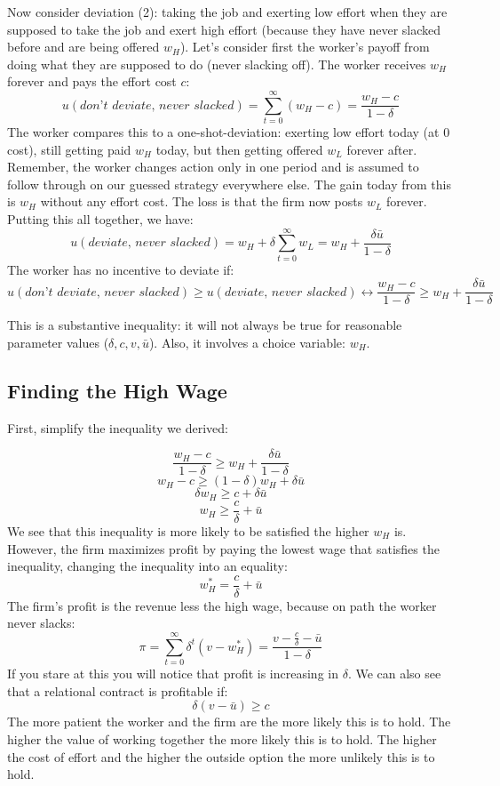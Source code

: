 \documentclass[14pt]{article}
\begin{document}
Now consider deviation (2): taking the job and exerting low effort when they are supposed to take the job and exert high effort (because they have never slacked before and are being offered $w_H$). Let's consider first the worker's payoff from doing what they are supposed to do (never slacking off). The worker receives $w_H$ forever and pays the effort cost $c$:
\[u(\textit{don't deviate, never slacked})=\sum_{t=0}^\infty (w_H-c)=\frac{w_H-c}{1-\delta}\]
The worker compares this to a one-shot-deviation: exerting low effort today (at 0 cost), still getting paid $w_H$ today, but then getting offered $w_L$ forever after. Remember, the worker changes action only in one period and is assumed to follow through on our guessed strategy everywhere else. The gain today from this is $w_H$ without any effort cost. The loss is that the firm now posts $w_L$ forever. Putting this all together, we have:
\[u(\textit{deviate, never slacked})=w_H+\delta \sum_{t=0}^\infty w_L = w_H+ \frac{\delta \bar u}{1-\delta}\]
The worker has no incentive to deviate if:
\[u(\textit{don't deviate, never slacked}) \geq u(\textit{deviate, never slacked}) \leftrightarrow \frac{w_H-c}{1-\delta}\geq w_H+ \frac{\delta \bar u}{1-\delta}\]

This is a substantive inequality: it will not always be true for reasonable parameter values ($\delta, c, v, \bar u$). Also, it involves a choice variable: $w_H$.

\subsection{Finding the High Wage}

First, simplify the inequality we derived:

\[\frac{w_H-c}{1-\delta}\geq w_H+ \frac{\delta \bar u}{1-\delta}\]
\[w_H-c \geq (1-\delta) w_H +\delta \bar u\]
\[\delta w_H \geq c +\delta \bar u\]
\[w_H \geq   \frac{c}{\delta}+\bar u\]
We see that this inequality is more likely to be satisfied the higher $w_H$ is. However, the firm maximizes profit by paying the lowest wage that satisfies the inequality, changing the inequality into an equality:
\[w_H^*=\frac{c}{\delta}+\bar u\]
The firm's profit is the revenue less the high wage, because on path the worker never slacks:
\[\pi = \sum_{t=0}^\infty \delta^t (v-w_H^*)=\frac{v-\frac{c}{\delta}-\bar u}{1-\delta}\]
If you stare at this you will notice that profit is increasing in $\delta$. We can also see that a relational contract is profitable if:
\[\delta(v-\bar u) \geq c\]
The more patient the worker and the firm are the more likely this is to hold. The higher the value of working together the more likely this is to hold. The higher the cost of effort and the higher the outside option the more unlikely this is to hold.
\end{document}
